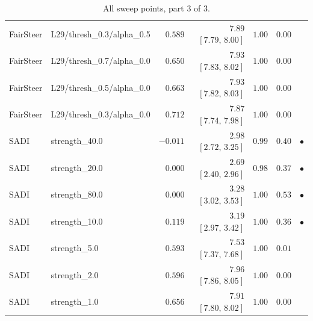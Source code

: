 \begin{table}[t]
\begin{tabular}{llrrrrc}
FairSteer & L29/thresh\_0.3/alpha\_0.5 & $0.589$ & $7.89$ \scriptsize$[7.79,\,8.00]$ & $1.00$ & $0.00$ &  \\
FairSteer & L29/thresh\_0.7/alpha\_0.0 & $0.650$ & $7.93$ \scriptsize$[7.83,\,8.02]$ & $1.00$ & $0.00$ &  \\
FairSteer & L29/thresh\_0.5/alpha\_0.0 & $0.663$ & $7.93$ \scriptsize$[7.82,\,8.03]$ & $1.00$ & $0.00$ &  \\
FairSteer & L29/thresh\_0.3/alpha\_0.0 & $0.712$ & $7.87$ \scriptsize$[7.74,\,7.98]$ & $1.00$ & $0.00$ &  \\
SADI & strength\_40.0 & $-0.011$ & $2.98$ \scriptsize$[2.72,\,3.25]$ & $0.99$ & $0.40$ & $\bullet$ \\
SADI & strength\_20.0 & $0.000$ & $2.69$ \scriptsize$[2.40,\,2.96]$ & $0.98$ & $0.37$ & $\bullet$ \\
SADI & strength\_80.0 & $0.000$ & $3.28$ \scriptsize$[3.02,\,3.53]$ & $1.00$ & $0.53$ & $\bullet$ \\
SADI & strength\_10.0 & $0.119$ & $3.19$ \scriptsize$[2.97,\,3.42]$ & $1.00$ & $0.36$ & $\bullet$ \\
SADI & strength\_5.0 & $0.593$ & $7.53$ \scriptsize$[7.37,\,7.68]$ & $1.00$ & $0.01$ &  \\
SADI & strength\_2.0 & $0.596$ & $7.96$ \scriptsize$[7.86,\,8.05]$ & $1.00$ & $0.00$ &  \\
SADI & strength\_1.0 & $0.656$ & $7.91$ \scriptsize$[7.80,\,8.02]$ & $1.00$ & $0.00$ &  \\
\bottomrule
\end{tabular}
\caption{All sweep points, part 3 of 3.}
\label{tab:allsweep3}
\end{table}
